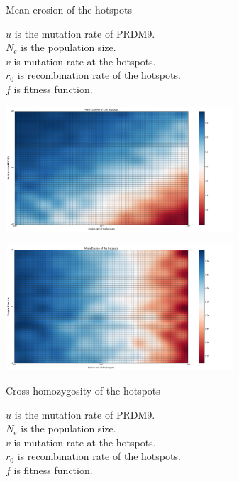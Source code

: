\documentclass[10pt]{beamer}
\begin{document}
\begin{frame}
	\begin{center}
		\Large
    	Mean erosion of the hotspots
	\end{center}
	$ u $ is the mutation rate of PRDM9. \\
	$ N_e $ is the population size. \\ 
	$ v $ is mutation rate at the hotspots. \\
	$ r_0 $ is recombination rate of the hotspots. \\
	$ f $ is fitness function. \\
\end{frame}

\begin{frame}
	\begin{center}
       \includegraphics[width=8.5cm]{Images/mean-erosion-mutation-erosion.png}
	\end{center}
\end{frame}


\begin{frame}
	\begin{center}
       \includegraphics[width=8.5cm]{Images/mean-erosion-population-erosion.png}
	\end{center}
\end{frame}

\begin{frame}
	\begin{center}
		\Large
    	Cross-homozygosity of the hotspots
	\end{center}
	$ u $ is the mutation rate of PRDM9. \\
	$ N_e $ is the population size. \\ 
	$ v $ is mutation rate at the hotspots. \\
	$ r_0 $ is recombination rate of the hotspots. \\
	$ f $ is fitness function. \\
\end{frame}
\end{document}
